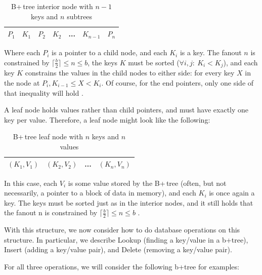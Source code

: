 \documentclass[a4paper,12pt]{article}
\begin{document}
\begin{table}[h]
\centering
\begin{tabular}{|l|l|l|l|l|l|l|}
\hline
$P_1$ & $K_1$ & $P_2$ & $K_2$ & ... & $K_{n-1}$ & $P_n$\\
\hline
\end{tabular}
\caption{B+\,tree interior node with $n-1$ keys and $n$ subtrees}
\label{tab:interior-node}
\end{table}

Where each $P_i$ is a pointer to a child node, and each $K_i$ is a key. The fanout $n$ is constrained by $\lceil \frac{b}{2} \rceil \leq n \leq b$, the keys $K$ must be sorted ($ \forall i, j: \ K_i < K_j$), and each key $K$ constrains the values in the child nodes to either side: for every key $X$ in the node at $P_i, K_{i-1} \leq X < K_i$. Of course, for the end pointers, only one side of that inequality will hold \cite{elmasri_navathe_2011}.

A leaf node holds values rather than child pointers, and must have exactly one key per value. Therefore, a leaf node might look like the following:

\begin{table}[h]
\centering
\begin{tabular}{|l|l|l|l|}
\hline
$(K_1,V_1)$ & $(K_2,V_2)$ & ... & $(K_n,V_n)$\\
\hline
\end{tabular}
\caption{B+\,tree leaf node with $n$ keys and $n$ values}
\label{tab:leaf-node}
\end{table}

In this case, each $V_i$ is some value stored by the B+\,tree (often, but not necessarily, a pointer to a block of data in memory), and each $K_i$ is once again a key. The keys must be sorted just as in the interior nodes, and it still holds that the fanout n is constrained by $\lceil \frac{b}{2} \rceil \leq n \leq b$ \cite{elmasri_navathe_2011}.

With this structure, we now consider how to do database operations on this structure. In particular, we describe Lookup (finding a key/value in a b+tree), Insert (adding a key/value pair), and Delete (removing a key/value pair).

For all three operations, we will consider the following b+tree for examples:
\end{document}
